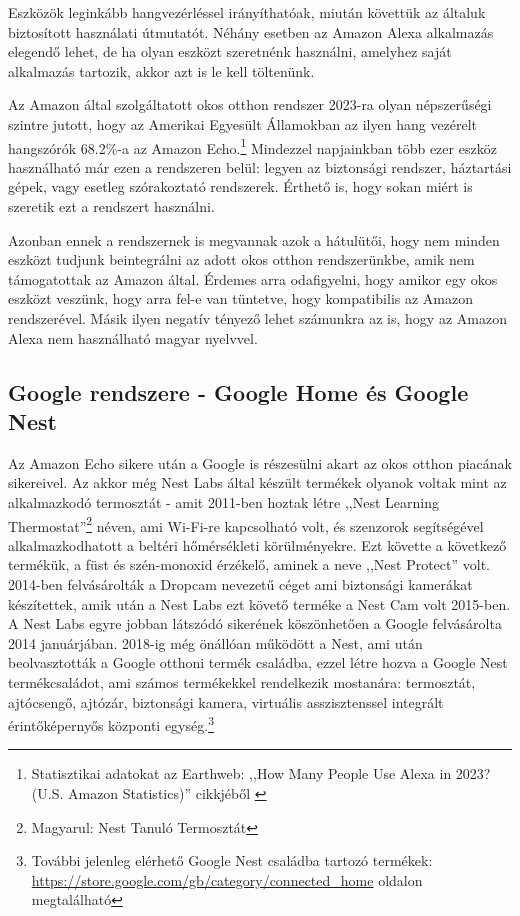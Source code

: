 \documentclass[
]{thesis-ekf}
\theoremstyle{definition}
\theoremstyle{remark}
\begin{document}
	Eszközök leginkább hangvezérléssel irányíthatóak, miután követtük az általuk biztosított használati útmutatót. Néhány esetben az Amazon Alexa alkalmazás elegendő lehet, de ha olyan eszközt szeretnénk használni, amelyhez saját alkalmazás tartozik, akkor azt is le kell töltenünk.
	
	Az Amazon által szolgáltatott okos otthon rendszer 2023-ra olyan népszerűségi szintre jutott, hogy az Amerikai Egyesült Államokban az ilyen hang vezérelt hangszórók 68.2\%-a az Amazon Echo.\footnote{Statisztikai adatokat az Earthweb: ,,How Many People Use Alexa in 2023? (U.S. Amazon Statistics)'' cikkjéből \cite{amazon-stats}} Mindezzel napjainkban több ezer eszköz használható már ezen a rendszeren belül: legyen az biztonsági rendszer, háztartási gépek, vagy esetleg szórakoztató rendszerek. Érthető is, hogy sokan miért is szeretik ezt a rendszert használni.
	
	Azonban ennek a rendszernek is megvannak azok a hátulütői, hogy nem minden eszközt tudjunk beintegrálni az adott okos otthon rendszerünkbe, amik nem támogatottak az Amazon által. Érdemes arra odafigyelni, hogy amikor egy okos eszközt veszünk, hogy arra fel-e van tüntetve, hogy kompatibilis az Amazon rendszerével. Másik ilyen negatív tényező lehet számunkra az is, hogy az Amazon Alexa nem használható magyar nyelvvel.
	
	\subsection*{Google rendszere - Google Home és Google Nest}
	
	Az Amazon Echo sikere után a Google is részesülni akart az okos otthon piacának sikereivel. Az akkor még Nest Labs által készült termékek olyanok voltak mint az alkalmazkodó termosztát - amit 2011-ben hoztak létre ,,Nest Learning Thermostat''\footnote{Magyarul: Nest Tanuló Termosztát} néven, ami Wi-Fi-re kapcsolható volt, és szenzorok segítségével alkalmazkodhatott a beltéri hőmérsékleti körülményekre. Ezt követte a következő termékük, a füst és szén-monoxid érzékelő, aminek a neve ,,Nest Protect'' volt. 2014-ben felvásárolták a Dropcam nevezetű céget ami biztonsági kamerákat készítettek, amik után a Nest Labs ezt követő terméke a Nest Cam volt 2015-ben. A Nest Labs egyre jobban látszódó sikerének köszönhetően a Google felvásárolta 2014 januárjában. 2018-ig még önállóan működött a Nest, ami után beolvasztották a Google otthoni termék családba, ezzel létre hozva a Google Nest termékcsaládot, ami számos termékekkel rendelkezik mostanára: termosztát, ajtócsengő, ajtózár, biztonsági kamera, virtuális asszisztenssel integrált érintőképernyős központi egység.\footnote{\label{google-store} További jelenleg elérhető Google Nest családba tartozó termékek: \url{https://store.google.com/gb/category/connected_home} oldalon megtalálható}
	
\end{document}
